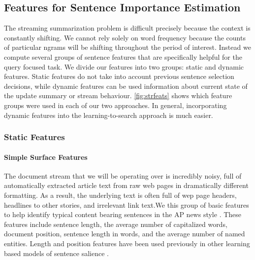 


\subsection{Features for Sentence Importance Estimation}

The streaming summarization problem is difficult precisely because the context
is constantly shifting. We cannot rely solely on word frequency because
the counts of particular ngrams will be shifting throughout the period of 
interest. Instead we compute several groups of sentence features that are
specifically helpful for the query focused task. We divide our features
into two groups: static and dynamic features. Static features do not take into
account previous sentence selection decisions, while dynamic features
can be used information about current state of the update summary or stream
behaviour. \autoref{fig:strfeats} shows which feature groups were used 
in each of our two approaches. In general, incorporating dynamic features
into the learning-to-search approach is much easier.


\subsubsection{Static Features}
\paragraph{Simple Surface Features} 

The document stream that we will be operating over is incredibly noisy,
full of automatically extracted article text from raw web pages in 
dramatically different formatting. As a result, the underlying text is often
full of wep page headers, headlines to other stories, and irrelevant link text.We this group of basic features to help identify typical content bearing
sentences in the AP news style \citep{ap_style_guide}. These features 
include sentence length, the average number of capitalized words,
document position, sentence length in words, and the average number of 
named entities. Length and position features have been used previously in
other learning based models of sentence salience
\citep{kupiec1995trainable,conroy2001using}.

